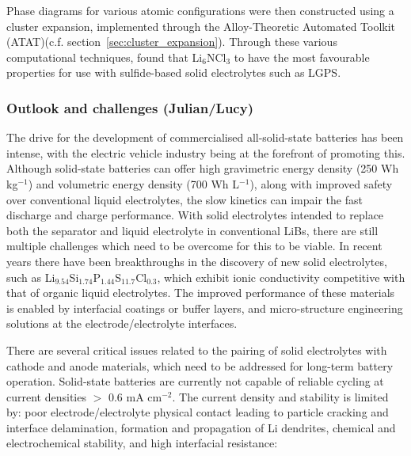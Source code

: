 \documentclass[../main.tex]{subfiles}
\begin{document}
Phase diagrams for various atomic configurations were then constructed using a cluster expansion, implemented through the Alloy-Theoretic Automated Toolkit (ATAT)(c.f. section~\ref{sec:cluster_expansion}).\cite{Hart2008, VandeWalle2002} Through these various computational techniques, \citeauthor{Sang2020} found that Li$_6$NCl$_3$ to have the most favourable properties for use with sulfide-based solid electrolytes such as LGPS.\cite{Sang2020}

\subsubsection{Outlook and challenges (Julian/Lucy)}
\label{sec:outlook_electrolytes}
The drive for the development of commercialised all-solid-state batteries has been intense, with the electric vehicle industry being at the forefront of promoting this.\cite{Woods_2021} Although solid-state batteries can offer high gravimetric energy density (250 Wh kg$^{-1}$) and volumetric energy density (700 Wh L$^{-1}$), along with improved safety over conventional liquid electrolytes, the slow kinetics can impair the fast discharge and charge performance. With solid electrolytes intended to replace both the separator and liquid electrolyte in conventional LiBs, \cite{schnell2020solid} there are still multiple challenges which need to be overcome for this to be viable. In recent years there have been breakthroughs in the discovery of new solid electrolytes, such as Li$_{9.54}$Si$_{1.74}$P$_{1.44}$S$_{11.7}$Cl$_{0.3}$, \cite{kato2016high} which exhibit ionic conductivity competitive with that of organic liquid electrolytes. The improved performance of these materials is enabled by interfacial coatings or buffer layers, and micro-structure engineering solutions at the electrode/electrolyte interfaces.  \cite{kim2021solid}

There are several critical issues related to the pairing of solid electrolytes with cathode and anode materials, which need to be addressed for long-term battery operation. Solid-state batteries are currently not capable of reliable cycling at current densities $>$ 0.6 mA cm$^{-2}$\cite{famprikis_fundamentals_2019, Albertus2018}. The current density and stability is limited by: poor electrode/electrolyte physical contact leading to particle cracking and interface delamination, formation and propagation of Li dendrites, chemical and electrochemical stability, and high interfacial resistance: \cite{famprikis_fundamentals_2019} 
\end{document}
